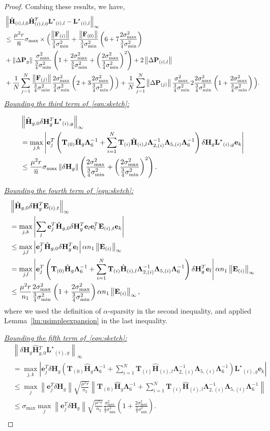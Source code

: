 \documentclass[twoside,11pt]{article}
\newcommand{\abs}[1]{\left\vert #1\right\vert}
\newcommand{\norm}[1]{\left\lVert#1\right\rVert}
\newcommand{\matE}{\mathbf{E}}
\newcommand{\matF}{\mathbf{F}}
\newcommand{\hmatH}{{\hat{\mathbf{H}}}{}}
\newcommand{\matLst}{{\mathbf{L}^\star}}
\newcommand{\matP}{\mathbf{P}}
\newcommand{\matT}{\mathbf{T}}
\newcommand{\matLambda}{\mathbf{\Lambda}}
\newcommand{\dtmatH}{\delta\mathbf{H}}
\newcommand{\vece}{\mathbf{e}}
\newcommand{\gop}{\sigma_{\max}}
\newcommand{\bn}{{\overline{n}}}
\newcommand{\Bi}{\norm{\matE_{(i)}}_{\infty}}
\newcommand{\murntwo}{\frac{\mu^2 r}{n_2}}
\newcommand{\murnb}{\frac{\mu^2 r}{\overline{n}}}
\newcommand{\sms}{\sigma_{\min}^2}
\newcommand{\tkappa}{\frac{2\gop^2}{\frac{3}{4}\sms}}
\newcommand{\brtkappa}{\left(\frac{2\gop^2}{\frac{3}{4}\sms}\right)}
\newcommand{\hgzerodef}{\matT_{(0)}\hmatH_g\matLambda_6^{-1}+\sum_{i=1}^N\matT_{(i)}\hmatH_{(i),l}\matLambda_{2,(i)}^{-1}\matLambda_{5,(i)}\matLambda_6^{-1}}
\begin{document}
\begin{proof}
Combing these results, we have,
\begin{align}
&\norm{\hmatH_{(i),l,0}\hmatH_{(i),l,0}^T\matLst_{(i),l}-\matLst_{(i),l}}_{\infty}\notag\\
&\le \murnb \gop \times \Big(\frac{\norm{\matF_{(i)}}}{\frac{3}{4}\sms}+\frac{\norm{\matF_{(0)}}}{\frac{3}{4}\sms}\left(6+7\tkappa\right)\notag\\
&+\norm{\Delta\matP_{g}}\frac{\gop^2}{\frac{3}{4}\sms}\left(1+\tkappa+\brtkappa^2\right)+2\norm{\Delta\matP_{(i),l}}\notag\\
&+\frac{1}{N}\sum_{j=1}^N\frac{\norm{\matF_{(j)}}}{\frac{3}{4}\sms}\tkappa\left(2+3\tkappa\right)\Big)+\frac{1}{N}\sum_{j=1}^N\norm{\Delta\matP_{(j)}}\frac{\gop^2}{\frac{3}{4}\sms}2\tkappa\left(1+\tkappa\right)\Big).\notag\\
\end{align}
\noindent\underline{\it Bounding the third term of~\eqref{eqn:sketch}:}

\begin{align}
&\norm{\hmatH_{g,0}\dtmatH_g^T\matLst_{(i),g}}_{\infty}\notag\\
&=\max_{j,k}\abs{\vece_j^T\left(\hgzerodef\right)\dtmatH_g\matLst_{(i),g}\vece_k}\notag\\
&\le \frac{\mu^2 r}{\bn} \gop\norm{\dtmatH_g}\left(\tkappa+\brtkappa^2\right).\notag\\
\label{eqn:thirdterm}
\end{align}

\noindent\underline{\it Bounding the fourth term of~\eqref{eqn:sketch}:}
\begin{align}
&\norm{\hmatH_{g,0}\dtmatH_g^T\matE_{(i),t}}_{\infty}\notag\\
&=\max_{j,k}\abs{\sum_l\vece_j^T\hmatH_{g,0}\dtmatH_g^T\vece_l\vece_l^T\matE_{(i),t}\vece_k}\notag\\
&\le\max_{j,l}\abs{\vece_j^T\hmatH_{g,0}\dtmatH_g^T\vece_l}\alpha n_1 \Bi \notag\\
&=\max_{j,l}\abs{\vece_j^T\left(\hgzerodef\right)\dtmatH_g^T\vece_l}\alpha n_1 \Bi \notag\\
&\le\frac{\mu^2 r}{n_1}\frac{2\gop^2}{\frac{3}{4}\sms}\left(1+\tkappa\right)\alpha n_1\Bi,\notag\\
\label{eqn:fourthterm}
\end{align}
where we used the definition of $\alpha$-sparsity in the second inequality, and applied Lemma~\ref{lm:usimpleexpansion} in the last inequality.

\noindent\underline{\it Bounding the fifth term of~\eqref{eqn:sketch}:}
\begin{align*}
&\norm{\dtmatH_g\hmatH_{g,0}^T\matLst_{(i),g}}_{\infty}\\
&=\max_{j,k}\abs{\vece_j^T\dtmatH_g\left(\hgzerodef\right)\matLst_{(i),g}\vece_k}\\
&\le \max_j\norm{\vece_j^T\dtmatH_g}\sqrt{\murntwo}\norm{\hgzerodef}\\
&\le \gop\max_j\norm{\vece_j^T\dtmatH_g}\sqrt{\murntwo}\frac{\gop^2}{\frac{3}{4}\sms}\left(1+\tkappa\right).\\
\end{align*}



\end{proof}
\end{document}

